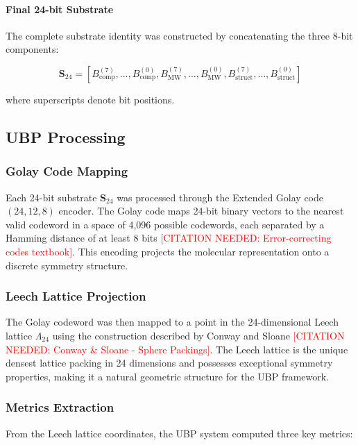 \documentclass[11pt,letterpaper]{article}
\begin{document}
\paragraph{Final 24-bit Substrate}
The complete substrate identity was constructed by concatenating the three 8-bit components:

\begin{equation}
    \mathbf{S}_{24} = [B_{\text{comp}}^{(7)}, \ldots, B_{\text{comp}}^{(0)}, B_{\text{MW}}^{(7)}, \ldots, B_{\text{MW}}^{(0)}, B_{\text{struct}}^{(7)}, \ldots, B_{\text{struct}}^{(0)}]
\end{equation}

where superscripts denote bit positions.

\subsection{UBP Processing}

\subsubsection{Golay Code Mapping}
Each 24-bit substrate $\mathbf{S}_{24}$ was processed through the Extended Golay code $(24,12,8)$ encoder. The Golay code maps 24-bit binary vectors to the nearest valid codeword in a space of 4,096 possible codewords, each separated by a Hamming distance of at least 8 bits \textcolor{red}{[CITATION NEEDED: Error-correcting codes textbook]}. This encoding projects the molecular representation onto a discrete symmetry structure.

\subsubsection{Leech Lattice Projection}
The Golay codeword was then mapped to a point in the 24-dimensional Leech lattice $\Lambda_{24}$ using the construction described by Conway and Sloane \textcolor{red}{[CITATION NEEDED: Conway \& Sloane - Sphere Packings]}. The Leech lattice is the unique densest lattice packing in 24 dimensions and possesses exceptional symmetry properties, making it a natural geometric structure for the UBP framework.

\subsubsection{Metrics Extraction}
From the Leech lattice coordinates, the UBP system computed three key metrics:
\end{document}
